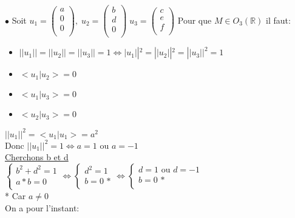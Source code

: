 \documentclass{article}
\begin{document}
$\bullet$ Soit $u_1 = \begin{pmatrix}
    a\\
    0\\
    0\\
\end{pmatrix}, \; u_2 = \begin{pmatrix}
    b\\
    d\\
    0\\
\end{pmatrix} \; u_3 = \begin{pmatrix}
    c\\
    e\\
    f\\
\end{pmatrix}$
Pour que $M \in O_3(\mathbb{R})$ il faut:
\begin{itemize}
    \item $||u_1|| = ||u_2|| = ||u_3|| = 1 \Leftrightarrow |u_1||^2 = ||u_2||^2 = ||u_3||^2 = 1$
    \item $<u_1 | u_2> = 0$
    \item $<u_1 | u_3> = 0$
    \item $<u_2 | u_3> = 0$
\end{itemize}
$||u_1||^2 = <u_1|u_1> = a^2$\\
Donc $||u_1||^2 = 1 \Leftrightarrow a = 1 \mbox{ ou } a = -1$\\
\newpage
\noindent \underline{Cherchons b et d} \vspace*{5mm} \\ 
$\left\{
    \begin{array}{ll}
        b^2 + d^2 = 1\\
        a * b = 0\\
    \end{array}
\right. \Leftrightarrow \left\{
    \begin{array}{ll}
        d^2 = 1\\
        b = 0 \mbox{ *}\\
    \end{array}
\right. \Leftrightarrow \left\{
    \begin{array}{ll}
        d = 1 \mbox{ ou } d = -1\\
        b = 0 \mbox{ *}\\
    \end{array}
\right.$ \vspace*{5mm}\\
* Car $a \neq 0$\\
On a pour l'instant:\\
\end{document}
